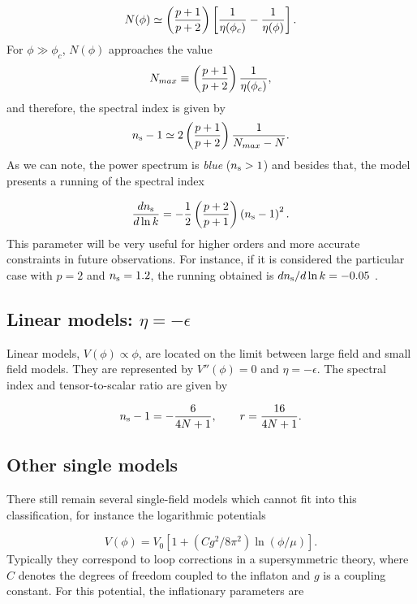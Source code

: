 \documentclass{rmaa}
\def\beq{\begin{equation}}
\def\eeq{\end{equation}}
\begin{document}
\beq
N(\phi)\simeq \left( {p+1 \over p+2} \right)\left[ {1 \over \eta(\phi_c) }- {1 \over \eta(\phi)}\right]. 
\eeq
%
For $\phi \gg \phi_c$, $N(\phi)$ approaches the value
%
\beq
N_{max}\equiv \left( {p+1 \over p+2} \right) {1 \over \eta (\phi_c)},
\eeq
%
and therefore, the spectral index is given by
 $$
n_{\rm s}-1 \simeq 2 \left( \frac{p+1}{p+2}\right) \frac{1}{N_{max}-N}.
 $$
%
As we can note, the power spectrum is \textit{blue} ($n_{\rm s}>1$) and besides that, the model presents 
a running of the spectral index

\begin{equation}
\label{eq:dsirunning}
{dn_{\rm s} \over d\ln{k}} = -{1 \over 2} \left({p + 2 \over p + 1}\right) 
\left(n_{\rm s} - 1\right)^2.
\end{equation}
%
 This parameter  will be very useful for higher orders and more accurate constraints in 
 future observations. For instance, if it is considered the particular case with $p = 2$ 
 and $n_{\rm s} = 1.2$, the running obtained is $dn_{\rm s} / d\ln{k} = -0.05$ \citep{Kinney3}. 

\subsection{Linear models: $\eta = - \epsilon$}


Linear models, $V\left(\phi\right) \propto \phi$, are located on the limit between
large field and small field models. They are represented by $V''\left(\phi\right) = 0$ and $\eta =
- \epsilon$. The spectral index and tensor-to-scalar ratio are given by 

\beq
n_{\rm s}-1=-{6\over 4N+1},\qquad
r = {16 \over 4N+1} .
\eeq

\subsection{Other single models}

There still remain several single-field models which cannot fit into this classification, 
for instance the logarithmic potentials \citep{Barrow2}

\beq
V\left(\phi\right) =V_0\left[1+(C g^2/8\pi^2)
\ln\left(\phi/\mu\right)\right].
\eeq
%
Typically they correspond to loop corrections in a supersymmetric theory,
where $C$ denotes the degrees of freedom coupled
to the inflaton and $g$ is a coupling constant.  
%
For this potential, the inflationary parameters are
\end{document}
